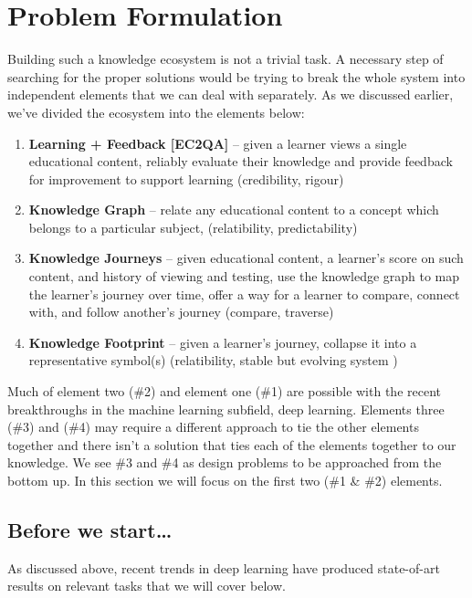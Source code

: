 \documentclass[]{book}
\theoremstyle{definition}
\theoremstyle{definition}
\theoremstyle{definition}
\theoremstyle{remark}
\begin{document}
\section{Problem Formulation}\label{problem-formulation}

Building such a knowledge ecosystem is not a trivial task. A necessary
step of searching for the proper solutions would be trying to break the
whole system into independent elements that we can deal with separately.
As we discussed earlier, we've divided the ecosystem into the elements
below:

\begin{enumerate}
\def\labelenumi{\arabic{enumi}.}
\item
  \textbf{Learning + Feedback {[}EC2QA{]}} -- given a learner views a
  single educational content, reliably evaluate their knowledge and
  provide feedback for improvement to support learning (credibility,
  rigour)
\item
  \textbf{Knowledge Graph} -- relate any educational content to a
  concept which belongs to a particular subject, (relatibility,
  predictability)
\item
  \textbf{Knowledge Journeys} -- given educational content, a learner's
  score on such content, and history of viewing and testing, use the
  knowledge graph to map the learner's journey over time, offer a way
  for a learner to compare, connect with, and follow another's journey
  (compare, traverse)
\item
  \textbf{Knowledge Footprint} -- given a learner's journey, collapse it
  into a representative symbol(s) (relatibility, stable but evolving
  system )
\end{enumerate}

Much of element two (\#2) and element one (\#1) are possible with the
recent breakthroughs in the machine learning subfield, deep learning.
Elements three (\#3) and (\#4) may require a different approach to tie
the other elements together and there isn't a solution that ties each of
the elements together to our knowledge. We see \#3 and \#4 as design
problems to be approached from the bottom up. In this section we will
focus on the first two (\#1 \& \#2) elements.

\subsection{Before we start\ldots{}}\label{before-we-start}

As discussed above, recent trends in deep learning have produced
state-of-art results on relevant tasks that we will cover below.
\end{document}
